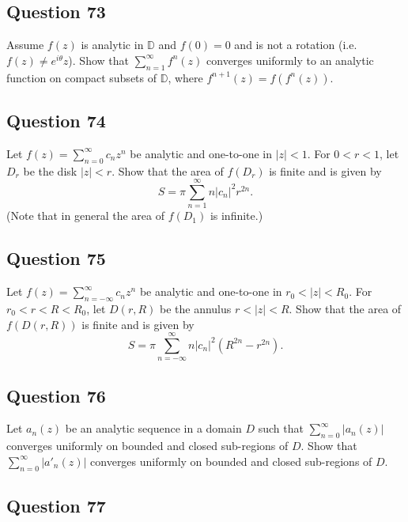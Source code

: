 \documentclass[12pt]{article}
\begin{document}
\hypertarget{question-73-2}{%
\subsection{Question 73}\label{question-73-2}}

Assume \(f(z)\) is analytic in \({\mathbb D}\) and \(f(0)=0\) and is not
a rotation (i.e.~\(f(z) \neq e^{i \theta} z\)). Show that
\(\displaystyle \sum_{n=1}^\infty f^{n}(z)\) converges uniformly to an
analytic function on compact subsets of \({\mathbb D}\), where
\(f^{n+1}(z) = f(f^{n}(z))\).

\hypertarget{question-74-2}{%
\subsection{Question 74}\label{question-74-2}}

Let \(f(z) = \sum_{n=0}^\infty c_n z^n\) be analytic and one-to-one in
\(|z| < 1\). For \(0<r<1\), let \(D_r\) be the disk \(|z|<r\). Show that
the area of \(f(D_r)\) is finite and is given by
\[S = \pi \sum_{n=1}^\infty n |c_n|^2 r^{2n}.\] (Note that in general
the area of \(f(D_1)\) is infinite.)

\hypertarget{question-75-2}{%
\subsection{Question 75}\label{question-75-2}}

Let \(f(z) = \sum_{n= -\infty}^\infty c_n z^n\) be analytic and
one-to-one in \(r_0< |z| < R_0\). For \(r_0<r<R<R_0\), let \(D(r,R)\) be
the annulus \(r<|z|<R\). Show that the area of \(f(D(r,R))\) is finite
and is given by
\[S = \pi \sum_{n=- \infty}^\infty n |c_n|^2 (R^{2n} - r^{2n}).\]

\hypertarget{question-76-2}{%
\subsection{Question 76}\label{question-76-2}}

Let \(a_n(z)\) be an analytic sequence in a domain \(D\) such that
\(\displaystyle \sum_{n=0}^\infty |a_n(z)|\) converges uniformly on
bounded and closed sub-regions of \(D\). Show that
\(\displaystyle \sum_{n=0}^\infty |a'_n(z)|\) converges uniformly on
bounded and closed sub-regions of \(D\).

\hypertarget{question-77-2}{%
\subsection{Question 77}\label{question-77-2}}
\end{document}

